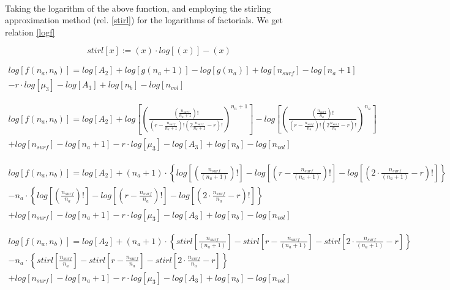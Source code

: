\documentclass[10pt,letterpaper]{article}
\newcommand{\nads}[1]{
    \ensuremath{
        \frac{
            n_{surf}
        }{
            #1
        }
    }
}
\newcommand{\nlp}[1]{
    \ensuremath{
        r
        -
        \nads{#1}
    }
}
\newcommand{\stirl}[1]{
    \ensuremath{
        \left(
            #1
        \right)
        \cdotp 
        log
        \left[
            \left(
            #1
            \right)
        \right]
        -
        \left(
            #1
        \right)
    }
}
\newcommand{\logOFgOFm}[1]{
	\ensuremath{
	#1
	\cdot
	\left\{
    	log
    	\left[
    	    \left(
    	        \nads{#1}
    	    \right)!
    	\right]
    	-
    	log
    	\left[
        	\left(
        	    \nlp{#1}
        	\right)!
    	\right]
    	-
    	log
    	\left[
    	    \left(
        	    2
        	    \cdot
        	    \nads{#1}
        	    -
        	    r
            \right)!
    	\right]
	\right\}
	}
}
\newcommand{\StirlOFgOFm}[1]{
	\ensuremath{
	#1
	\cdot
	\left\{
    	stirl
    	\left[
    	        \nads{#1}
    	\right]
    	-
    	stirl
    	\left[
        	    \nlp{#1}
    	\right]
    	-
    	stirl
    	\left[
        	    2
        	    \cdot
        	    \nads{#1}
        	    -
        	    r
    	\right]
	\right\}
	}
}
\newcommand{\gOFm}[2]{
\left( \frac{
\left(\frac{#2}{#1}\right)!}{ 
\left(r-\frac{#2}{#1}\right)! 
\left(2\frac{#2}{#1}-r\right)!}
\right)^{#1}  
}
\begin{document}
\text{}\\
\noindent Taking the logarithm of the above function, and employing the stirling approximation method (rel. \ref{stirl}) for the logarithms of factorials. We get relation \ref{logf}

\begin{equation}
	\boxed{stirl[x]:=\stirl{x}}
	\label{stirl}
\end{equation}


\begin{multline}
	log
	\left[
	f(n_a,n_b)
	\right]
	=
	log
		\left[
		A_2
		\right]
		+
		log\left[
            g(n_a+1)
        \right]
        -
        log\left[
            g(n_a)
        \right]
		+
		log
		\left[
		n_{surf}
		\right]
		-
		log
		\left[
		n_a+1
		\right]\\
		-
		r
		\cdot
		log
		\left[
		\mu_{3}
		\right]
		-
		log
		\left[
		A_3
		\right]
		+
		log
		\left[
		n_{b}
		\right]
		-
		log
		\left[
		n_{vol}	
	\right]
		\label{logf}
\end{multline}


\begin{multline}
	log
	\left[
	f(n_a,n_b)
	\right]
	=
	log
		\left[
		A_2
		\right]
		+
		log\left[
            \gOFm{n_a+1}{n_{surf}}
        \right]
        -
        log\left[
            \gOFm{n_a}{n_{surf}}
        \right]\\
		+
		log
		\left[
		n_{surf}
		\right]
		-
		log
		\left[
		n_a+1
		\right]
		-
		r
		\cdot
		log
		\left[
		\mu_{3}
		\right]
		-
		log
		\left[
		A_3
		\right]
		+
		log
		\left[
		n_{b}
		\right]
		-
		log
		\left[
		n_{vol}	
	\right]
		\label{logfexpnd1}
\end{multline}


\begin{multline}
	log
	\left[
	    f(n_a,n_b)
	\right]
	=
	log
	\left[
		A_2
	\right]
	+
	\logOFgOFm{(n_a+1)}\\
    -
    \logOFgOFm{n_a}\\
	+
	log
	\left[
		n_{surf}
	\right]
		-
		log
		\left[
		n_a+1
		\right]
		-
		r
		\cdot
		log
		\left[
		\mu_{3}
		\right]
		-
		log
		\left[
		A_3
		\right]
		+
		log
		\left[
		n_{b}
		\right]
		-
		log
		\left[
		n_{vol}	
	\right]
		\label{logfexpnd1}
\end{multline}

\begin{multline}
	log
	\left[
	    f(n_a,n_b)
	\right]
	=
	log
	\left[
		A_2
	\right]
	+
	\StirlOFgOFm{(n_a+1)}\\
    -
    \StirlOFgOFm{n_a}\\
	+
	log
	\left[
		n_{surf}
	\right]
		-
		log
		\left[
		n_a+1
		\right]
		-
		r
		\cdot
		log
		\left[
		\mu_{3}
		\right]
		-
		log
		\left[
		A_3
		\right]
		+
		log
		\left[
		n_{b}
		\right]
		-
		log
		\left[
		n_{vol}	
	\right]
		\label{stirlOFexpnd1}
\end{multline}
\end{document}

